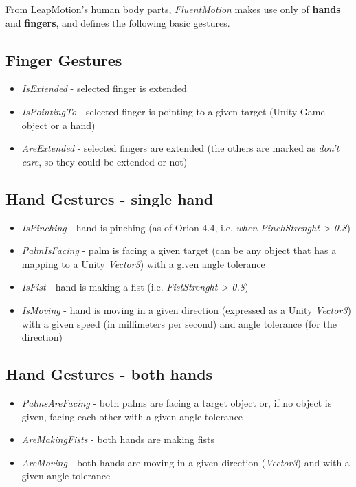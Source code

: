 \documentclass{sigchi}
\def\fluentmotion{\textit{FluentMotion}}
\def\leap{LeapMotion}
\begin{document}
From \leap{}'s human body parts, \fluentmotion{} makes use only of \textbf{hands} and \textbf{fingers}, and defines the following basic gestures.

\subsection{Finger Gestures}
\begin{itemize}
  \item \textit{IsExtended} - selected finger is extended
  \item \textit{IsPointingTo} - selected finger is pointing to a given target (Unity Game object or a hand)
  \item \textit{AreExtended} - selected fingers are extended (the others are marked as \textit{don't care}, so they could be extended or not)
\end{itemize}

\subsection{Hand Gestures - single hand}

\begin{itemize}
  \item \textit{IsPinching} - hand is pinching (as of Orion 4.4, i.e. \textit{when PinchStrenght > 0.8})
  \item \textit{PalmIsFacing} - palm is facing a given target (can be any object that has a mapping to a Unity \textit{Vector3}) with a given angle tolerance
  \item  \textit{IsFist} - hand is making a fist (i.e. \textit{FistStrenght > 0.8})
  \item \textit{IsMoving} - hand is moving in a given direction (expressed as a Unity \textit{Vector3}) with a given speed (in millimeters per second) and angle tolerance (for the direction) 
\end{itemize}

\subsection{Hand Gestures - both hands}
\begin{itemize}
  \item \textit{PalmsAreFacing} - both palms are facing a target object or, if no object is given, facing each other with a given angle tolerance
  \item \textit{AreMakingFists} - both hands are making fists
  \item \textit{AreMoving} - both hands are moving in a given direction (\textit{Vector3}) and with a given angle tolerance
\end{itemize}
\end{document}
